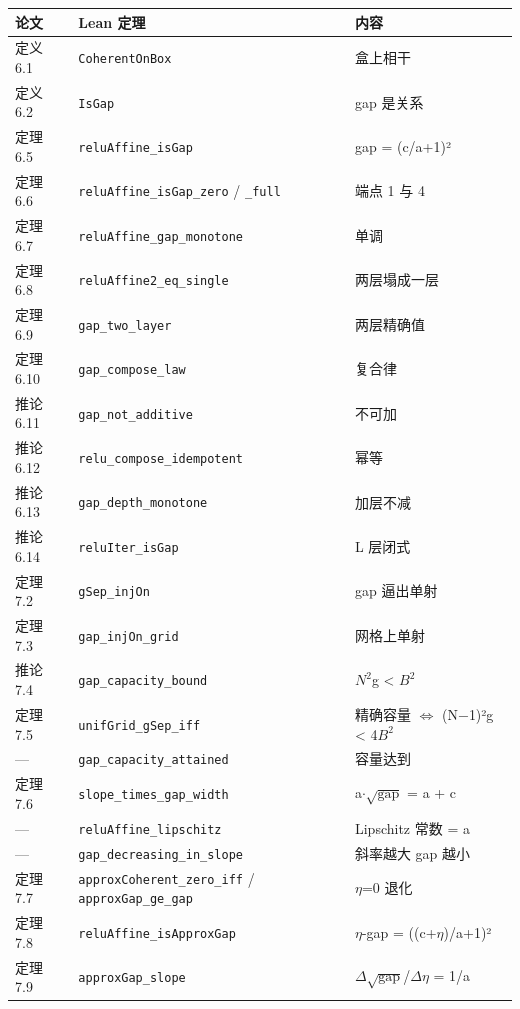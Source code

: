 \documentclass[11pt,a4paper]{ctexart}
\begin{document}
\begin{center}\small
\begin{tabular}{lll}
\toprule
论文 & Lean 定理 & 内容 \\
\midrule
定义 6.1 & \texttt{CoherentOnBox} & 盒上相干 \\
定义 6.2 & \texttt{IsGap} & gap 是关系 \\
定理 6.5 & \texttt{reluAffine\_isGap} & gap = (c/a+1)² \\
定理 6.6 & \texttt{reluAffine\_isGap\_zero} / \texttt{\_full} & 端点 1 与 4 \\
定理 6.7 & \texttt{reluAffine\_gap\_monotone} & 单调 \\
定理 6.8 & \texttt{reluAffine2\_eq\_single} & 两层塌成一层 \\
定理 6.9 & \texttt{gap\_two\_layer} & 两层精确值 \\
定理 6.10 & \texttt{gap\_compose\_law} & 复合律 \\
推论 6.11 & \texttt{gap\_not\_additive} & 不可加 \\
推论 6.12 & \texttt{relu\_compose\_idempotent} & 幂等 \\
推论 6.13 & \texttt{gap\_depth\_monotone} & 加层不减 \\
推论 6.14 & \texttt{reluIter\_isGap} & L 层闭式 \\
定理 7.2 & \texttt{gSep\_injOn} & gap 逼出单射 \\
定理 7.3 & \texttt{gap\_injOn\_grid} & 网格上单射 \\
推论 7.4 & \texttt{gap\_capacity\_bound} & \ensuremath{N^{2}}g < \ensuremath{B^{2}} \\
定理 7.5 & \texttt{unifGrid\_gSep\_iff} & 精确容量 \ensuremath{\Longleftrightarrow} (N\ensuremath{-}1)²g < 4\ensuremath{B^{2}} \\
— & \texttt{gap\_capacity\_attained} & 容量达到 \\
定理 7.6 & \texttt{slope\_times\_gap\_width} & a\ensuremath{\cdot}\ensuremath{\sqrt{\mathrm{gap}}} = a + c \\
— & \texttt{reluAffine\_lipschitz} & Lipschitz 常数 = a \\
— & \texttt{gap\_decreasing\_in\_slope} & 斜率越大 gap 越小 \\
定理 7.7 & \texttt{approxCoherent\_zero\_iff} / \texttt{approxGap\_ge\_gap} & \ensuremath{\eta}=0 退化 \\
定理 7.8 & \texttt{reluAffine\_isApproxGap} & \ensuremath{\eta}-gap = ((c+\ensuremath{\eta})/a+1)² \\
定理 7.9 & \texttt{approxGap\_slope} & \ensuremath{\Delta}\ensuremath{\sqrt{\mathrm{gap}}}/\ensuremath{\Delta}\ensuremath{\eta} = 1/a \\

\end{tabular}
\end{center}
\end{document}
